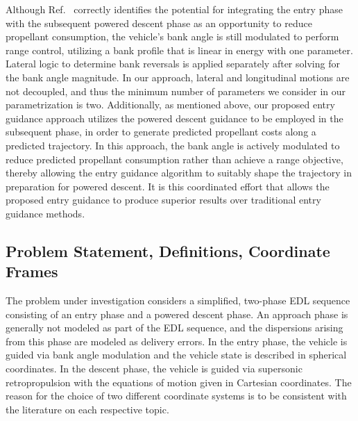 \documentclass[letterpaper, preprint, paper,11pt]{AAS}
\begin{document}
Although Ref.~\cite{LuAdaptiveEDL} correctly identifies the potential for integrating the entry phase with the subsequent powered descent phase as an opportunity to reduce propellant consumption, the vehicle's bank angle is still modulated to perform range control, utilizing a bank profile that is linear in energy with one parameter. Lateral logic to determine bank reversals is applied separately after solving for the bank angle magnitude. In our approach, lateral and longitudinal motions are not decoupled, and thus the minimum number of parameters we consider in our parametrization is two. %
Additionally, as mentioned above, our proposed entry guidance approach utilizes the powered descent guidance to be employed in the subsequent phase, in order to generate predicted propellant costs along a predicted trajectory. In this approach, the bank angle is actively modulated to reduce predicted propellant consumption rather than achieve a range objective, thereby allowing the entry guidance algorithm to suitably shape the trajectory in preparation for powered descent. It is this coordinated effort that allows the proposed entry guidance to produce superior results over traditional entry guidance methods. 



\subsection{Problem Statement, Definitions, Coordinate Frames}
The problem under investigation considers a simplified, two-phase EDL sequence consisting of an entry phase and a powered descent phase. An approach phase is generally not modeled as part of the EDL sequence, and the dispersions arising from this phase are modeled as delivery errors. In the entry phase, the vehicle is guided via bank angle modulation and the vehicle state is described in spherical coordinates. In the descent phase, the vehicle is guided via supersonic retropropulsion with the equations of motion given in Cartesian coordinates.  The reason for the choice of two different coordinate systems is to be consistent with the literature on each respective topic.
\end{document}
